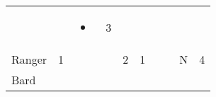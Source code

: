 \documentclass[12pt]{article}
\newcommand{\indexClass}[1]{\index{#1}}
\newcommand{\class}[1]{#1\indexClass{#1}}
\begin{document}
\begin{longtable}[]{@{}llllllllll@{}}
\begin{minipage}[t]{0.06\columnwidth}\raggedright\strut
\strut\end{minipage} &
\begin{minipage}[t]{0.06\columnwidth}\raggedright\strut
\strut\end{minipage} &
\begin{minipage}[t]{0.07\columnwidth}\raggedright\strut
\begin{itemize}
\item
\end{itemize}
\strut\end{minipage} &
\begin{minipage}[t]{0.08\columnwidth}\raggedright\strut
3
\strut\end{minipage}\tabularnewline
\begin{minipage}[t]{0.13\columnwidth}\raggedright\strut
\class{Ranger}
\strut\end{minipage} &
\begin{minipage}[t]{0.06\columnwidth}\raggedright\strut
1
\strut\end{minipage} &
\begin{minipage}[t]{0.06\columnwidth}\raggedright\strut
\strut\end{minipage} &
\begin{minipage}[t]{0.06\columnwidth}\raggedright\strut
\strut\end{minipage} &
\begin{minipage}[t]{0.06\columnwidth}\raggedright\strut
2
\strut\end{minipage} &
\begin{minipage}[t]{0.06\columnwidth}\raggedright\strut
1
\strut\end{minipage} &
\begin{minipage}[t]{0.06\columnwidth}\raggedright\strut
\strut\end{minipage} &
\begin{minipage}[t]{0.06\columnwidth}\raggedright\strut
\strut\end{minipage} &
\begin{minipage}[t]{0.07\columnwidth}\raggedright\strut
N
\strut\end{minipage} &
\begin{minipage}[t]{0.08\columnwidth}\raggedright\strut
4
\strut\end{minipage}\tabularnewline
\begin{minipage}[t]{0.13\columnwidth}\raggedright\strut
\class{Bard}
\strut\end{minipage} &

\end{longtable}
\end{document}
